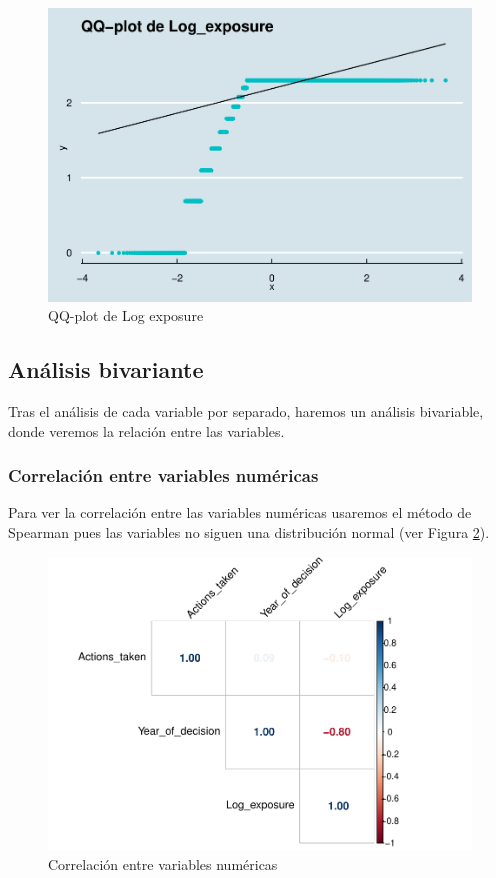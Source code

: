 \documentclass[
]{article}
\begin{document}
\begin{figure}

{\centering \includegraphics[width=0.5\linewidth]{anacalt-regresion_files/figure-latex/qq_log-1} 

}

\caption{QQ-plot de Log exposure}\label{fig:qq_log}
\end{figure}

\hypertarget{anuxe1lisis-bivariante}{%
\subsection{Análisis bivariante}\label{anuxe1lisis-bivariante}}

Tras el análisis de cada variable por separado, haremos un análisis
bivariable, donde veremos la relación entre las variables.

\hypertarget{correlaciuxf3n-entre-variables-numuxe9ricas}{%
\subsubsection{Correlación entre variables
numéricas}\label{correlaciuxf3n-entre-variables-numuxe9ricas}}

Para ver la correlación entre las variables numéricas usaremos el método
de Spearman pues las variables no siguen una distribución normal (ver
Figura \ref{fig:corr}).

\begin{figure}

{\centering \includegraphics[width=0.75\linewidth]{anacalt-regresion_files/figure-latex/corr-1} 

}

\caption{Correlación entre variables numéricas}\label{fig:corr}
\end{figure}
\end{document}
